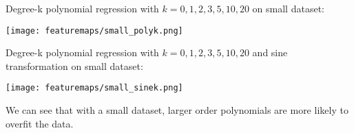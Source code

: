 \begin{answer}

\graphicspath{ {./featuremaps/} }

Degree-k polynomial regression with $k=0,1,2,3,5,10,20$ on small dataset:

\texttt{[image: featuremaps/small\_polyk.png]}

Degree-k polynomial regression with $k=0,1,2,3,5,10,20$ and sine transformation on small dataset:

\texttt{[image: featuremaps/small\_sinek.png]}

We can see that with a small dataset, larger order polynomials are more likely to overfit the data. 

\end{answer}


